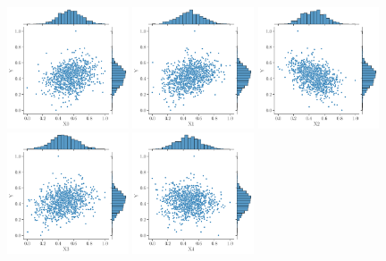 \begin{figure}
    \centering
    \includegraphics[width=0.32\textwidth]{./part2/figures/SIS/cathare_jointplot_X0.pdf}
    \includegraphics[width=0.32\textwidth]{./part2/figures/SIS/cathare_jointplot_X1.pdf}
    \includegraphics[width=0.32\textwidth]{./part2/figures/SIS/cathare_jointplot_X2.pdf}\\
    \includegraphics[width=0.32\textwidth]{./part2/figures/SIS/cathare_jointplot_X3.pdf}
    \includegraphics[width=0.32\textwidth]{./part2/figures/SIS/cathare_jointplot_X4.pdf}

\end{figure}

